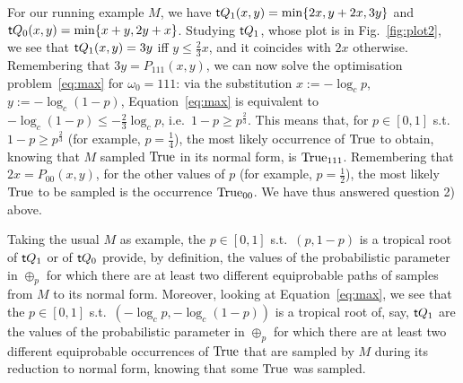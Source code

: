 For our running example $M$, we have $\mathsf{t} Q_1(x,y)=\min\{2x,y+2x,3y\}$ and $\mathsf{t} Q_0(x,y)=\min\{x+y,2y+x\}$.
Studying $\mathsf{t} Q_1$, whose plot is in Fig.~\ref{fig:plot2}, we see that $\mathsf{t} Q_1(x,y)=3y$ iff $y\leq \frac{2}{3}x$, and it coincides with $2x$ otherwise.
Remembering that $3y=P_{111}(x,y)$, we can now solve the optimisation problem~\ref{eq:max} for $\omega_0=111$:
via the substitution $x:=-\log_c p$, $y:=-\log_c (1-p)$, Equation~\ref{eq:max} is equivalent to $-\log_c (1-p)\leq -\frac{2}{3}\log_c p$, i.e.\ $1-p\geq p^{\frac{2}{3}}$.
This means that, for $p\in[0,1]$ s.t.\ $1-p\geq p^{\frac{2}{3}}$ (for example, $p=\frac{1}{4}$), the most likely occurrence of $\mathrm{True}$ to obtain, knowing that $M$ sampled $\mathrm{True}$ in its normal form, is $\mathrm{True}_{111}$.
Remembering that $2x=P_{00}(x,y)$, for the other values of $p$ (for example, $p=\frac{1}{2}$), the most likely $\mathrm{True}$ to be sampled is the occurrence $\mathrm{True}_{00}$.
We have thus answered question 2) above.

\begin{remark}\label{rem:troproots}
 Taking the usual $M$ as example, the $p\in[0,1]$ s.t.\ $(p,1-p)$ is a tropical root of $\mathsf{t} Q_1$ or of $\mathsf{t} Q_0$ provide, by definition, the values of the probabilistic parameter in $\oplus_p$ for which there are at least two different equiprobable paths of samples from $M$ to its normal form.
 Moreover, looking at Equation~\ref{eq:max}, we see that the $p\in[0,1]$ s.t.\ $(-\log_c p,-\log_c(1-p))$ is a tropical root of, say, $\mathsf{t} Q_1$ are the values of the probabilistic parameter in $\oplus_p$ for which there are at least two different equiprobable occurrences of $\mathrm{True}$ that are sampled by $M$ during its reduction to normal form, knowing that some $\mathrm{True}$ was sampled.
\end{remark}

